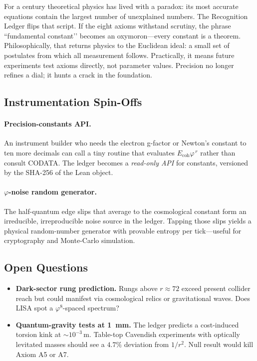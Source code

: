 \documentclass[11pt]{article}
\begin{document}
For a century theoretical physics has lived with a paradox: its most
accurate equations contain the largest number of unexplained numbers.
The Recognition Ledger flips that script.  If the eight axioms withstand
scrutiny, the phrase “fundamental constant’’ becomes an oxymoron—every
constant is a theorem.  Philosophically, that returns physics to the
Euclidean ideal: a small set of postulates from which all measurement
follows.  Practically, it means future experiments test axioms directly,
not parameter values.  Precision no longer refines a dial; it hunts a
crack in the foundation.

\subsection*{Instrumentation Spin-Offs}

\paragraph{Precision-constants API.}
An instrument builder who needs the electron g-factor or Newton’s
constant to ten more decimals can call a tiny routine that evaluates
\(E_{\text{coh}}\varphi^{\,r}\) rather than consult CODATA.  The ledger
becomes a \emph{read-only API} for constants, versioned by the SHA-256 of
the Lean object.

\paragraph{\(\varphi\)-noise random generator.}
The half-quantum edge slips that average to the cosmological constant
form an irreducible, irreproducible noise source in the ledger.  Tapping
those slips yields a physical random-number generator with provable
entropy per tick—useful for cryptography and Monte-Carlo simulation.

\subsection*{Open Questions}

\begin{itemize}
  \item \textbf{Dark-sector rung prediction.}  
        Rungs above \(r\approx 72\) exceed present collider reach but
        could manifest via cosmological relics or gravitational waves.
        Does LISA spot a \(\varphi^{8}\)-spaced spectrum?
  \item \textbf{Quantum-gravity tests at \SI{1}{mm}.}  
        The ledger predicts a cost-induced torsion kink at
        \(\sim 10^{-3}\,\text{m}\).  Table-top Cavendish experiments with
        optically levitated masses should see a $4.7\%$ deviation from
        $1/r^{2}$.  Null result would kill Axiom A5 or A7.
\end{itemize}
\end{document}

